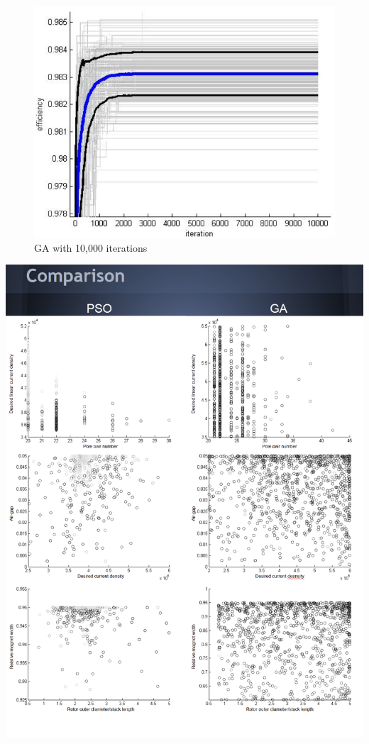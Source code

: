 \documentclass[twoside]{article}
\begin{document}
\newpage
\begin{figure}[h!]
\includegraphics[width=\textwidth,height=\textheight,keepaspectratio]{GA10k.png}
\caption{GA with 10,000 iterations}
\end{figure}
\newpage
\includegraphics[width=\textwidth,height=\textheight,keepaspectratio]{results1.png}
\end{document}
